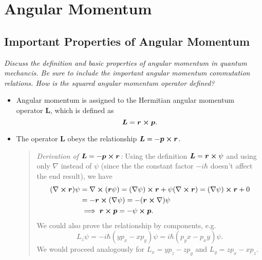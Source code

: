 \documentclass[11pt, a4paper]{article}
\renewcommand{\curl}{\nabla \cross}
\renewcommand{\grad}{\nabla}
\newcommand{\Herm}{Hermitian\xspace}
\renewcommand{\vec}[1]{\bm{#1}}  %
\renewcommand{\r}{\vec{r}}  %
\renewcommand{\L}{\vec{L}}  %
\newcommand{\p}{\psi}  %
\begin{document}
\newpage
\section{Angular Momentum}

\subsection{Important Properties of Angular Momentum}
\textit{Discuss the definition and basic properties of angular momentum in quantum mechancis. Be sure to include the important angular momentum commutation relations. How is the squared angular momentum operator defined?}
\begin{itemize}
	\item Angular momentum is assigned to the \Herm angular momentum operator $ \vec{L} $, which is defined as
    \begin{equation*}
        \L = \r \cross \vec{p}.
    \end{equation*}
    
    \item The operator $ \vec{L} $ obeys the relationship $ \L = - \vec{p} \cross \r $.
    \begin{quote}
        \textit{Derivation of $ \L = - \vec{p} \cross \r $:} Using the definition $ \L = \r \cross \p $ and using only $ \grad $ instead of $ \p $ (since the the constant factor $ - i \hbar $ doesn't affect the end result), we have
        \begin{align*}
            (\curl \r)\p &= \curl (\r \p) = (\grad \p) \cross \r + \p (\curl \r) = (\grad \p)\cross \r + 0\\
            & = - \r \cross (\grad \p) = - (\r \cross \grad)\p\\
            & \implies \r \cross \vec{p} = - \p \cross \vec{p}.
        \end{align*}
        We could also prove the relationship by components, e.g.
        \begin{equation*}
            L_{z}\p = - i\hbar(y p_{x} - xp_{y}) \p = i\hbar(p_{y}x - p_{x}y)\p.
        \end{equation*}
        We would proceed analogously for $ L_{x} = yp_{z} - zp_{y} $ and $ L_{y} = zp_{x} - x p_{z} $. 
    \end{quote}
	


\end{itemize}
\end{document}
